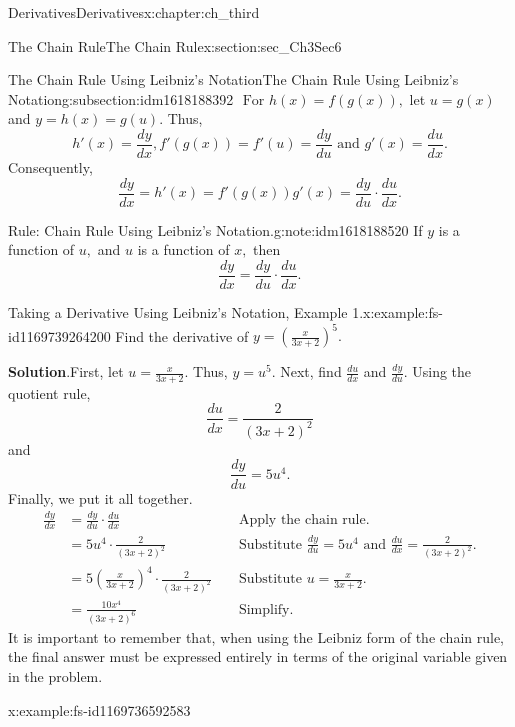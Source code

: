 \documentclass[oneside,10pt,]{book}
\newcommand{\blocktitlefont}{\relax}
\numberwithin{equation}{section}
\newcommand{\amp}{&}
\begin{document}
\begin{chapterptx}{Derivatives}{}{Derivatives}{}{}{x:chapter:ch_third}
\begin{sectionptx}{The Chain Rule}{}{The Chain Rule}{}{}{x:section:sec_Ch3Sec6}
\begin{subsectionptx}{The Chain Rule Using Leibniz’s Notation}{}{The Chain Rule Using Leibniz’s Notation}{}{}{g:subsection:idm1618188392}
\(\text{ For } h(x)=f(g(x)),\) let \(u=g(x)\) and \(y=h(x)=g(u).\) Thus,%
%
\begin{equation*}
h'(x)=\frac{dy}{dx},f'(g(x))=f'(u)=\frac{dy}{du} \text{ and } g'(x)=\frac{du}{dx}.
\end{equation*}
Consequently,%
%
\begin{equation*}
\frac{dy}{dx}=h'(x)=f'(g(x))g'(x)=\frac{dy}{du}\cdot \frac{du}{dx}.
\end{equation*}
\begin{note}{Rule: Chain Rule Using Leibniz’s Notation.}{g:note:idm1618188520}%
If \(y\) is a function of \(u,\) and \(u\) is a function of \(x,\) then%
%
\begin{equation*}
\frac{dy}{dx}=\frac{dy}{du}\cdot \frac{du}{dx}.
\end{equation*}
\end{note}
\begin{example}{Taking a Derivative Using Leibniz’s Notation, Example 1.}{x:example:fs-id1169739264200}%
Find the derivative of \(y=(\frac{x}{3x+2})^5.\)%
\par\smallskip%
\noindent\textbf{\blocktitlefont Solution}.\hypertarget{g:solution:idm1618184168}{}\quad{}First, let \(u=\frac{x}{3x+2}.\) Thus, \(y=u^5.\) Next, find \(\frac{du}{dx}\) and \(\frac{dy}{du}.\) Using the quotient rule,%
%
\begin{equation*}
\frac{du}{dx}=\frac{2}{(3x+2)^2}
\end{equation*}
and%
%
\begin{equation*}
\frac{dy}{du}=5u^4.
\end{equation*}
Finally, we put it all together.%
%
\begin{align*}
\frac{dy}{dx}\amp=\frac{dy}{du}\cdot \frac{du}{dx}\amp\amp\text{ Apply the chain rule. }\\
\amp=5u^4\cdot \frac{2}{(3x+2)^2} \amp \amp \text{ Substitute } \frac{dy}{du}=5u^4 \text{ and } \frac{du}{dx}=\frac{2}{(3x+2)^2}.\\
\amp=5(\frac{x}{3x+2})^4\cdot \frac{2}{(3x+2)^2}\amp\amp\text{ Substitute } u=\frac{x}{3x+2}.\\
\amp=\frac{10x^4}{(3x+2)^6}\amp\amp\text{ Simplify. }
\end{align*}
It is important to remember that, when using the Leibniz form of the chain rule, the final answer must be expressed entirely in terms of the original variable given in the problem.%
\end{example}
\begin{example}{}{x:example:fs-id1169736592583}%

\end{example}
\end{subsectionptx}
\end{sectionptx}
\end{chapterptx}
\end{document}
